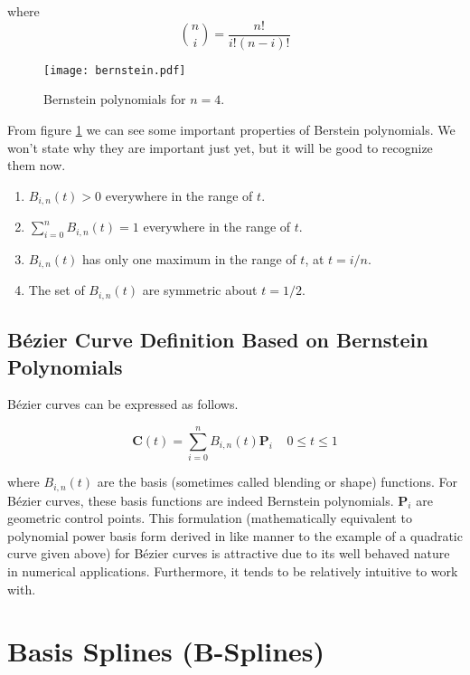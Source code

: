 where \begin{equation} {n\choose i} = \frac{n!}{i!(n-i)!} \end{equation} 

\begin{figure}[htbp]
	\centering
	\texttt{[image: bernstein.pdf]}
	\caption{Bernstein polynomials for $n=4$.}
	\label{fig:bernstein}
\end{figure}

From figure \cref{fig:bernstein} we can see some important properties of Berstein polynomials. We won't state why they are important just yet, but it will be good to recognize them now.

\begin{enumerate}
	\item $B_{i,n}(t) > 0$ everywhere in the range of $t$.
	\item $\sum_{i=0}^n B_{i,n}(t) = 1$ everywhere in the range of $t$.
	\item $B_{i,n}(t)$ has only one maximum in the range of $t$, at $t=i/n$.
	\item The set of  $B_{i,n}(t)$ are symmetric about $t=1/2$.
\end{enumerate}

\subsection{Bézier Curve Definition Based on Bernstein Polynomials}

Bézier curves can be expressed as follows.

\begin{equation} \textbf{C}(t) = \sum^n_{i=0}B_{i,n}(t) \textbf{P}_i~~~~~0\leq t \leq1 \end{equation}

where $B_{i,n}(t)$ are the basis (sometimes called blending or shape) functions. For Bézier curves, these basis functions are indeed Bernstein polynomials. \(\textbf{P}_i\) are geometric control points.  This formulation (mathematically equivalent to polynomial power basis form derived in like manner to the example of a quadratic curve given above) for Bézier curves is attractive due to its well behaved nature in numerical applications. Furthermore, it tends to be relatively intuitive to work with.

\section{Basis Splines (B-Splines)}

